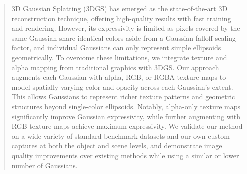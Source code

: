 
\begin{abstract}

\noindent
3D Gaussian Splatting (3DGS) has emerged as the state-of-the-art 3D reconstruction technique, offering high-quality results with fast training and rendering. 
However, its expressivity is limited as pixels covered by the same Gaussian share identical colors aside from a Gaussian falloff scaling factor, and individual Gaussians can only represent simple ellipsoids geometrically. To overcome these limitations, we integrate texture and alpha mapping from traditional graphics with 3DGS. Our approach augments each Gaussian with alpha, RGB, or RGBA texture maps to model spatially varying color and opacity across each Gaussian's extent. This allows Gaussians to represent richer texture patterns and geometric structures beyond single-color ellipsoids. Notably, alpha-only texture maps significantly improve Gaussian expressivity, while further augmenting with RGB texture maps achieve maximum expressivity. We validate our method on a wide variety of standard benchmark datasets and our own custom captures at both the object and scene levels, and demonstrate image quality improvements over existing methods while using a similar or lower number of Gaussians.


\end{abstract}
